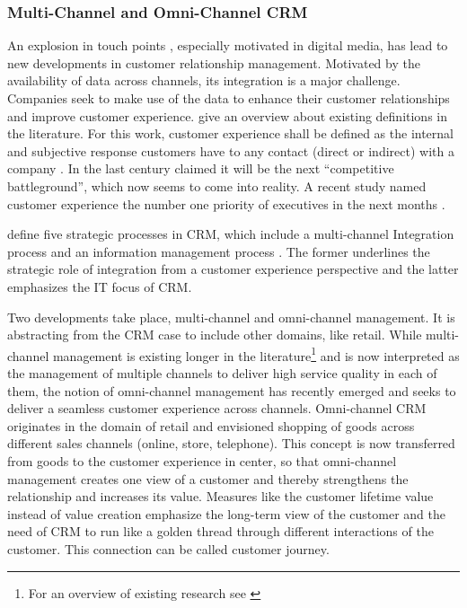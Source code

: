 	\subsubsection{Multi-Channel and Omni-Channel CRM}
		An explosion in touch points \citep{Lemon_2016}, especially motivated in digital media, has lead to new developments in customer relationship management. Motivated by the availability of data across channels, its integration is a major challenge. Companies seek to make use of the data to enhance their customer relationships and improve customer experience. \citeauthor{Lemon_2016} give an overview about existing definitions in the literature. For this work, customer experience shall be defined as the internal and subjective response customers have to any contact (direct or indirect) with a company \citep{meyer2007customer}. In the last century \citeauthor{gilmore1998} claimed it will be the next \enquote{competitive battleground}, which now seems to come into reality. A recent study named customer experience the number one priority of executives in the next months \citep{acc2015ce}.
		
		\citeauthor{payne2004role} define five strategic processes in \acrshort{CRM}, which include a multi-channel Integration process and an information management process \citep{payne2004role}. The former underlines the strategic role of integration from a customer experience perspective and the latter emphasizes the IT focus of CRM. 
		
		Two developments take place, multi-channel and omni-channel management. It is abstracting from the CRM case to include other domains, like retail. While multi-channel management is existing longer in the literature\footnote{For an overview of existing research see \citep{Neslin_2009}} and is now interpreted as the management of multiple channels to deliver high service quality in each of them, the notion of omni-channel management has recently emerged and seeks to deliver a seamless customer experience across channels. Omni-channel CRM originates in the domain of retail \citep{Brynjolfsson20131, rigby2011, Piotrowicz_2014} and envisioned shopping of goods across different sales channels (\ie online, store, telephone). This concept is now transferred from goods to the customer experience in center, so that omni-channel management creates one view of a customer and thereby strengthens the relationship and increases its value. Measures like the customer lifetime value instead of value creation emphasize the long-term view of the customer \citep{Lemon_2016} and the need of CRM to run like a golden thread through different interactions of the customer. This connection can be called customer journey. 
		
